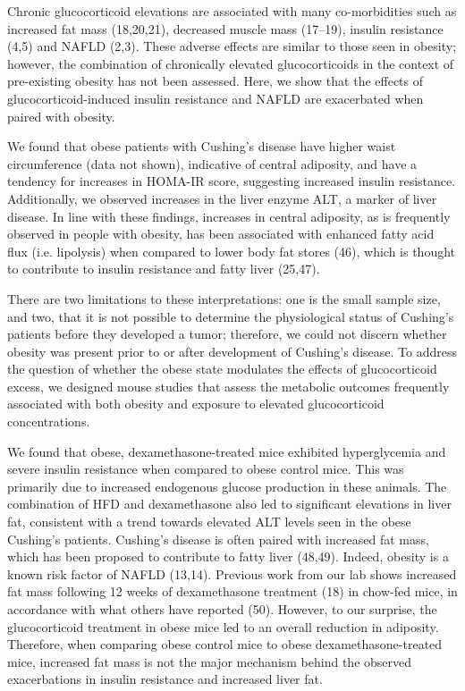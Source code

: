 \documentclass[11pt]{article} %
\begin{document}
Chronic glucocorticoid elevations are associated with many
co-morbidities such as increased fat mass (18,20,21), decreased muscle
mass (17--19), insulin resistance (4,5) and NAFLD (2,3). These adverse
effects are similar to those seen in obesity; however, the combination
of chronically elevated glucocorticoids in the context of pre-existing
obesity has not been assessed. Here, we show that the effects of
glucocorticoid-induced insulin resistance and NAFLD are exacerbated when
paired with obesity.

We found that obese patients with Cushing's disease have higher waist
circumference (data not shown), indicative of central adiposity, and
have a tendency for increases in HOMA-IR score, suggesting increased
insulin resistance. Additionally, we observed increases in the liver
enzyme ALT, a marker of liver disease. In line with these findings,
increases in central adiposity, as is frequently observed in people with
obesity, has been associated with enhanced fatty acid flux (i.e.
lipolysis) when compared to lower body fat stores (46), which is thought
to contribute to insulin resistance and fatty liver (25,47).

There are two limitations to these interpretations: one is the small
sample size, and two, that it is not possible to determine the
physiological status of Cushing's patients before they developed a
tumor; therefore, we could not discern whether obesity was present prior
to or after development of Cushing's disease. To address the question of
whether the obese state modulates the effects of glucocorticoid excess,
we designed mouse studies that assess the metabolic outcomes frequently
associated with both obesity and exposure to elevated glucocorticoid
concentrations.

We found that obese, dexamethasone-treated mice exhibited hyperglycemia
and severe insulin resistance when compared to obese control mice. This
was primarily due to increased endogenous glucose production in these
animals. The combination of HFD and dexamethasone also led to
significant elevations in liver fat, consistent with a trend towards
elevated ALT levels seen in the obese Cushing's patients. Cushing's
disease is often paired with increased fat mass, which has been proposed
to contribute to fatty liver (48,49). Indeed, obesity is a known risk
factor of NAFLD (13,14). Previous work from our lab shows increased fat
mass following 12 weeks of dexamethasone treatment (18) in chow-fed
mice, in accordance with what others have reported (50). However, to our
surprise, the glucocorticoid treatment in obese mice led to an overall
reduction in adiposity. Therefore, when comparing obese control mice to
obese dexamethasone-treated mice, increased fat mass is not the major
mechanism behind the observed exacerbations in insulin resistance and
increased liver fat.
\end{document}
